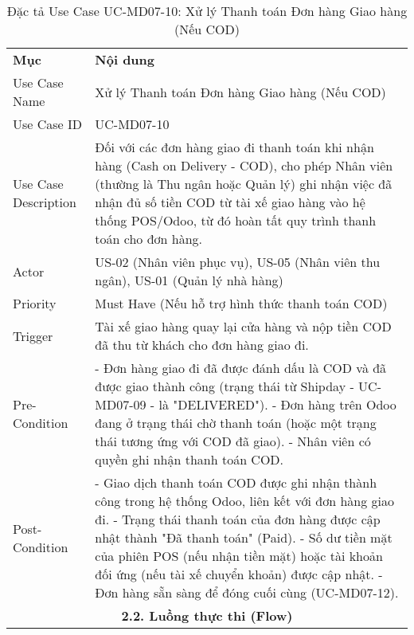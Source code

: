 \begin{longtable}{|m{4cm}|p{11cm}|}
\caption{Đặc tả Use Case UC-MD07-10: Xử lý Thanh toán Đơn hàng Giao hàng (Nếu COD)} \label{tab:uc_md07_10} \\
\hline

\endhead %
\hline
\endfoot %
\hline
\endlastfoot %
\multicolumn{2}{|c|}{\textbf{2.1. Tóm tắt (Summary)}} \\
\hline
\textbf{Mục} & \textbf{Nội dung} \\
\hline
Use Case Name & Xử lý Thanh toán Đơn hàng Giao hàng (Nếu COD) \\
\hline
Use Case ID & UC-MD07-10 \\
\hline
Use Case Description & Đối với các đơn hàng giao đi thanh toán khi nhận hàng (Cash on Delivery - COD), cho phép Nhân viên (thường là Thu ngân hoặc Quản lý) ghi nhận việc đã nhận đủ số tiền COD từ tài xế giao hàng vào hệ thống POS/Odoo, từ đó hoàn tất quy trình thanh toán cho đơn hàng. \\
\hline
Actor & US-02 (Nhân viên phục vụ), US-05 (Nhân viên thu ngân), US-01 (Quản lý nhà hàng) \\
\hline
Priority & Must Have (Nếu hỗ trợ hình thức thanh toán COD) \\
\hline
Trigger & Tài xế giao hàng quay lại cửa hàng và nộp tiền COD đã thu từ khách cho đơn hàng giao đi. \\
\hline
Pre-Condition & - Đơn hàng giao đi đã được đánh dấu là COD và đã được giao thành công (trạng thái từ Shipday - UC-MD07-09 - là "DELIVERED"). \newline - Đơn hàng trên Odoo đang ở trạng thái chờ thanh toán (hoặc một trạng thái tương ứng với COD đã giao). \newline - Nhân viên có quyền ghi nhận thanh toán COD. \\
\hline
Post-Condition & - Giao dịch thanh toán COD được ghi nhận thành công trong hệ thống Odoo, liên kết với đơn hàng giao đi. \newline - Trạng thái thanh toán của đơn hàng được cập nhật thành "Đã thanh toán" (Paid). \newline - Số dư tiền mặt của phiên POS (nếu nhận tiền mặt) hoặc tài khoản đối ứng (nếu tài xế chuyển khoản) được cập nhật. \newline - Đơn hàng sẵn sàng để đóng cuối cùng (UC-MD07-12). \\
\hline
\multicolumn{2}{|c|}{\textbf{2.2. Luồng thực thi (Flow)}} \\

\end{longtable}

